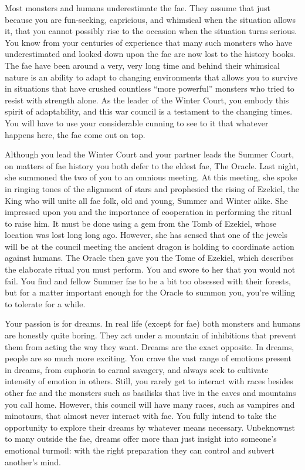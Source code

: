 \documentclass[char]{guildcamp2}
\begin{document}
\name{\cBabyFae{}}

Most monsters and humans underestimate the fae. They assume that just because you are fun-seeking, capricious, and whimsical when the situation allows it, that you cannot possibly rise to the occasion when the situation turns serious. You know from your centuries of experience that many such monsters who have underestimated and looked down upon the fae are now lost to the history books. The fae have been around a very, very long time and behind their whimsical nature is an ability to adapt to changing environments that allows you to survive in situations that have crushed countless ``more powerful'' monsters who tried to resist with strength alone. As the leader of the Winter Court, you embody this spirit of adaptability, and this war council is a testament to the changing times. You will have to use your considerable cunning to see to it that whatever happens here, the fae come out on top.

Although you lead the Winter Court and your partner \cTreeFae{\intro} leads the Summer Court, on matters of fae history you both defer to the eldest fae, The Oracle. Last night, she summoned the two of you to an omnious meeting. At this meeting, she spoke in ringing tones of the alignment of stars and prophesied the rising of Ezekiel, the King who will unite all fae folk, old and young, Summer and Winter alike.  She impressed upon you and \cTreeFae{} the importance of cooperation in performing the ritual to raise him. It must be done using a gem from the Tomb of Ezekiel, whose location was lost long long ago.  However, she has sensed that one of the jewels will be at the council meeting the ancient dragon \cOnyx{\intro} is holding to coordinate action against humans.  The Oracle then gave you the Tome of Ezekiel, which describes the elaborate ritual you must perform.  You and \cTreeFae{} swore to her that you would not fail. You find \cTreeFae{} and \cTreeFae{\their} fellow Summer fae to be a bit too obsessed with their forests, but for a matter important enough for the Oracle to summon you, you're willing to tolerate \cTreeFae{\them} for a while.

Your passion is for dreams. In real life (except for fae) both monsters and humans are honestly quite boring. They act under a mountain of inhibitions that prevent them from acting the way they want. Dreams are the exact opposite. In dreams, people are so much more exciting. You crave the vast range of emotions present in dreams, from euphoria to carnal savagery, and always seek to cultivate intensity of emotion in others. Still, you rarely get to interact with races besides other fae and the monsters such as basilisks that live in the caves and mountains you call home. However, this council will have many races, such as vampires and minotaurs, that almost never interact with fae. You fully intend to take the opportunity to explore their dreams by whatever means necessary. Unbeknownst to many outside the fae, dreams offer more than just insight into someone's emotional turmoil: with the right preparation they can control and subvert another's mind.
\end{document}
